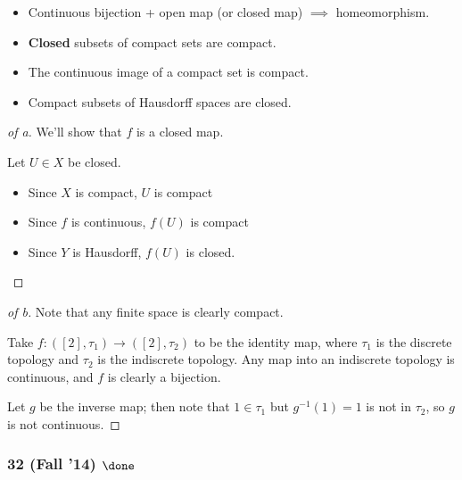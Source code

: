 \begin{concept}

\envlist

\begin{itemize}
\tightlist
\item
  Continuous bijection + open map (or closed map) \(\implies\)
  homeomorphism.
\item
  \textbf{Closed} subsets of compact sets are compact.
\item
  The continuous image of a compact set is compact.
\item
  Compact subsets of Hausdorff spaces are closed.
\end{itemize}

\end{concept}

\begin{solution}

\envlist

\begin{proof}[of a]

We'll show that \(f\) is a closed map.

Let \(U \in X\) be closed.

\begin{itemize}
\tightlist
\item
  Since \(X\) is compact, \(U\) is compact
\item
  Since \(f\) is continuous, \(f(U)\) is compact
\item
  Since \(Y\) is Hausdorff, \(f(U)\) is closed.
\end{itemize}

\end{proof}

\begin{proof}[of b]

Note that any finite space is clearly compact.

Take \(f: ([2], \tau_1) \to ([2], \tau_2)\) to be the identity map,
where \(\tau_1\) is the discrete topology and \(\tau_2\) is the
indiscrete topology. Any map into an indiscrete topology is continuous,
and \(f\) is clearly a bijection.

Let \(g\) be the inverse map; then note that \(1 \in \tau_1\) but
\(g^{-1}(1) = 1\) is not in \(\tau_2\), so \(g\) is not continuous.

\end{proof}

\end{solution}

\hypertarget{fall-14-done-1}{%
\subsubsection{\texorpdfstring{32 (Fall '14)
\(\done\)}{32 (Fall '14) \textbackslash done}}\label{fall-14-done-1}}

